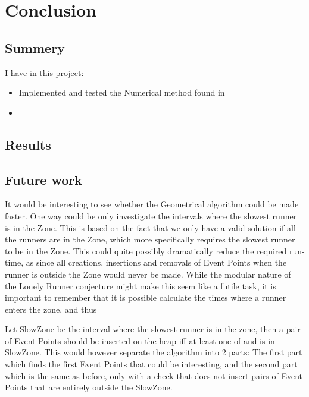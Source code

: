 

\section{Conclusion}
\label{conclusion}

\subsection{Summery}

I have in this project:
\begin{itemize}
\item Implemented and tested the Numerical method found in \cite{invis}
\item 
\end{itemize}

\subsection{Results}


\subsection{Future work}

It would be interesting to see whether the Geometrical algorithm could be made faster. One way could be only investigate the intervals where the slowest runner is in the Zone. This is based on the fact that we only have a valid solution if all the runners are in the Zone, which more specifically requires the slowest runner to be in the Zone. This could quite possibly dramatically reduce the required run-time, as since all creations, insertions and removals of Event Points when the runner is outside the Zone would never be made. While the modular nature of the Lonely Runner conjecture might make this seem like a futile task, it is important to remember that it is possible calculate the times where a runner enters the zone, and thus 

Let SlowZone be the interval where the slowest runner is in the zone, then a pair of Event Points should be inserted on the heap iff at least one of \comStart and \comFin is in SlowZone. This would however separate the algorithm into 2 parts: The first part which finds the first Event Points that could be interesting, and the second part which is the same as before, only with a check that does not insert pairs of Event Points that are entirely outside the SlowZone.
